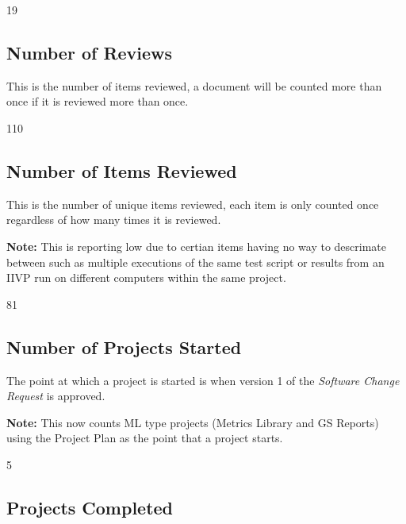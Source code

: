 \documentclass{article}
\begin{document}
\begin{Schunk}
\begin{Soutput}
[1] 19
\end{Soutput}
\end{Schunk}

\subsection{Number of Reviews}
This is the number of items reviewed, a document will be counted more than once
if it is reviewed more than once.

\begin{Schunk}
\begin{Soutput}
[1] 110
\end{Soutput}
\end{Schunk}

\subsection{Number of Items Reviewed}
This is the number of unique items reviewed, each item is only counted once
regardless of how many times it is reviewed.

\textbf{Note:} This is reporting low due to certian items having no way to
descrimate between such as multiple executions of the same test script or
results from an IIVP run on different computers within the same project.

\begin{Schunk}
\begin{Soutput}
[1] 81
\end{Soutput}
\end{Schunk}

\subsection{Number of Projects Started}
The point at which a project is started is when version 1 of the \textit{Software
Change Request} is approved.

\textbf{Note:} This now counts ML type projects (Metrics Library and GS Reports)
using the Project Plan as the point that a project starts.

\begin{Schunk}
\begin{Soutput}
[1] 5
\end{Soutput}
\end{Schunk}

\subsection{Projects Completed}
\end{document}
